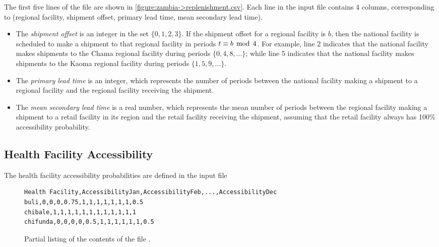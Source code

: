 The first five lines of the file are shown in
\autoref{figure:zambia->replenishment.csv}.
Each line in the input file contains 4 columns,
corresponding to (regional facility, shipment offset,
primary lead time, mean secondary lead time).
\begin{itemize}
\item
The \emph{shipment offset} is an integer in the set $\{0,1,2,3\}$.
If the shipment offset for a regional facility is $b$,
then the national facility is scheduled to make a shipment
to that regional facility in periods $t \equiv b\,\bmod\,4$.
For example, line 2 indicates that the national facility makes shipments
to the Chama regional facility
during periods $\{0, 4, 8, \ldots\}$;
while line 5 indicates that the national facility makes shipments
to the Kaoma regional facility
during periods $\{1, 5, 9, \ldots\}$.
\item
The \emph{primary lead time} is an integer,
which represents the number of periods between
the national facility making a shipment to a regional facility
and the regional facility receiving the shipment.
\item
The \emph{mean secondary lead time} is a real number,
which represents the mean number of periods between
the regional facility making a shipment to a retail facility in its region
and the retail facility receiving the shipment,
assuming that the retail facility always has 100\% accessibility probability.
\end{itemize}





\subsection{Health Facility Accessibility}

The health facility accessibility probabilities
are defined in the input file
\begin{quote}
\end{quote}

\begin{figure}[h!]
\begin{lstlisting}
Health Facility,AccessibilityJan,AccessibilityFeb,...,AccessibilityDec
buli,0,0,0,0.75,1,1,1,1,1,1,1,0.5
chibale,1,1,1,1,1,1,1,1,1,1,1,1
chifunda,0,0,0,0,0.5,1,1,1,1,1,1,0.5
\end{lstlisting}
\caption{Partial listing of the contents of
the file \protect{}.}
\label{figure:zambia->health-facilities-accessibility.csv}
\end{figure}

